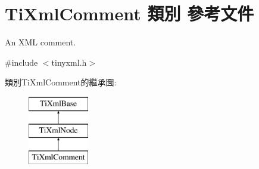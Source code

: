 \hypertarget{class_ti_xml_comment}{}\section{Ti\+Xml\+Comment 類別 參考文件}
\label{class_ti_xml_comment}


An X\+ML comment.  




{\ttfamily \#include $<$tinyxml.\+h$>$}

類別\+Ti\+Xml\+Comment的繼承圖\+:\begin{figure}[H]
\begin{center}
\leavevmode
\includegraphics[height=3.000000cm]{class_ti_xml_comment}
\end{center}
\end{figure}
